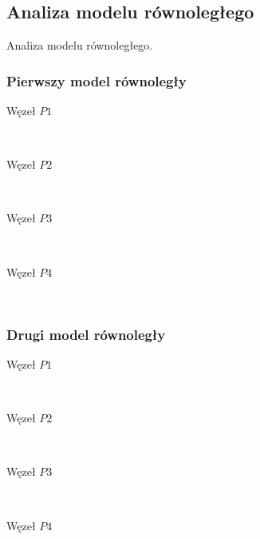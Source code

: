 \subsection{Analiza modelu równoległego}

Analiza modelu równoległego.


\subsubsection{Pierwszy model równoległy}

\begin{description}

\item[Węzeł $P1$] \hfill \\

\item[Węzeł $P2$] \hfill \\

\item[Węzeł $P3$] \hfill \\

\item[Węzeł $P4$] \hfill \\

\end{description}

\subsubsection{Drugi model równoległy}

\begin{description}

\item[Węzeł $P1$] \hfill \\

\item[Węzeł $P2$] \hfill \\

\item[Węzeł $P3$] \hfill \\

\item[Węzeł $P4$] \hfill \\

\end{description}
